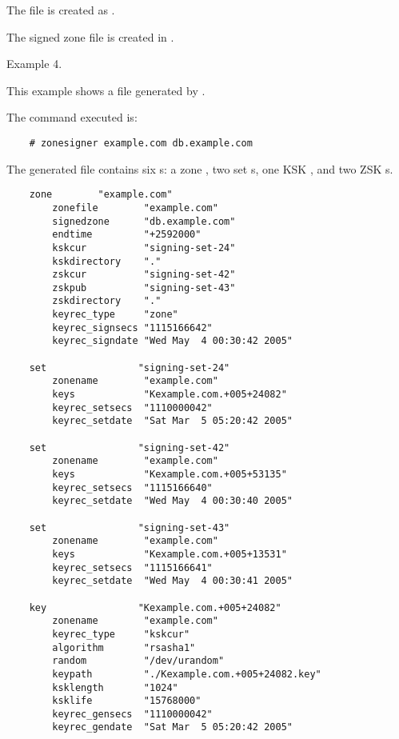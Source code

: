 The  file is created as .

The signed zone file is created in .

Example 4.

This example shows a  file generated by .

The command executed is:

\begin{verbatim}
    # zonesigner example.com db.example.com
\end{verbatim}

The generated  file contains six s:  a zone
, two set s, one KSK , and two
ZSK s.

\begin{verbatim}
    zone        "example.com"
        zonefile        "example.com"
        signedzone      "db.example.com"
        endtime         "+2592000"
        kskcur          "signing-set-24"
        kskdirectory    "."
        zskcur          "signing-set-42"
        zskpub          "signing-set-43"
        zskdirectory    "."
        keyrec_type     "zone"
        keyrec_signsecs "1115166642"
        keyrec_signdate "Wed May  4 00:30:42 2005"

    set                "signing-set-24"
        zonename        "example.com"
        keys            "Kexample.com.+005+24082"
        keyrec_setsecs  "1110000042"
        keyrec_setdate  "Sat Mar  5 05:20:42 2005"

    set                "signing-set-42"
        zonename        "example.com"
        keys            "Kexample.com.+005+53135"
        keyrec_setsecs  "1115166640"
        keyrec_setdate  "Wed May  4 00:30:40 2005"

    set                "signing-set-43"
        zonename        "example.com"
        keys            "Kexample.com.+005+13531"
        keyrec_setsecs  "1115166641"
        keyrec_setdate  "Wed May  4 00:30:41 2005"

    key                "Kexample.com.+005+24082"
        zonename        "example.com"
        keyrec_type     "kskcur"
        algorithm       "rsasha1"
        random          "/dev/urandom"
        keypath         "./Kexample.com.+005+24082.key"
        ksklength       "1024"
        ksklife         "15768000"
        keyrec_gensecs  "1110000042"
        keyrec_gendate  "Sat Mar  5 05:20:42 2005"


\end{verbatim}
